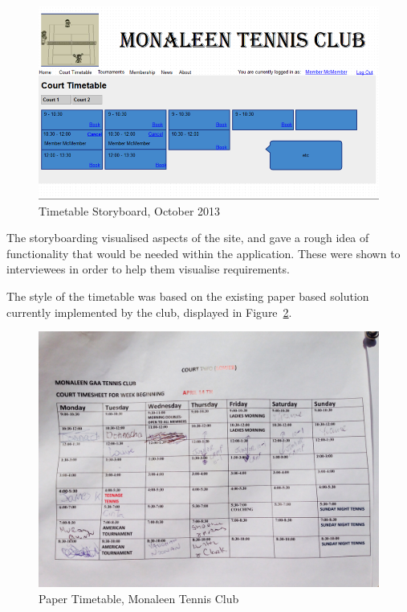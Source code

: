 \begin{figure}[H]
\begin{center}
\includegraphics[width=14cm]{storyboard.png}
\end{center}
\caption{Timetable Storyboard, October 2013}
\label{fig:timetableSB}
\end{figure}

The storyboarding visualised aspects of the site, and gave a rough idea of functionality that would be needed within the application. These were shown to interviewees in order to help them visualise requirements.

The style of the timetable was based on the existing paper based solution currently implemented by the club, displayed in Figure~\ref{fig:papertt}.

\begin{figure}[H]
\begin{center}
\includegraphics[width=14cm]{originaltt.jpg}
\end{center}
\caption{Paper Timetable, Monaleen Tennis Club}
\label{fig:papertt}
\end{figure}

